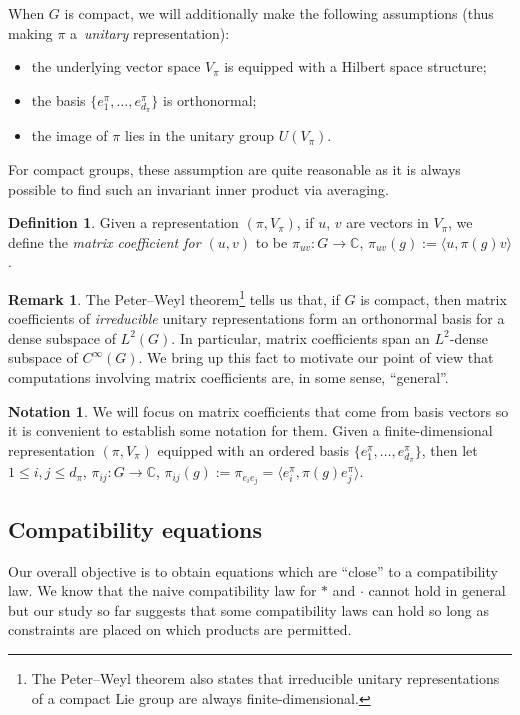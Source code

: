 \documentclass[pdftex]{sigma}
\numberwithin{equation}{section}
\theoremstyle{definition}
\newtheorem{Definition}[Theorem]{Definition}
\newtheorem{Remark}[Theorem]{Remark}
\newtheorem{notation}[Theorem]{Notation}
\begin{document}
When $ G $ is compact, we will additionally make the following assumptions (thus making $\pi$ a~\textit{unitary} representation):
\begin{itemize}\itemsep=0pt
  \item the underlying vector space $ V_\pi $ is equipped with a Hilbert space structure;
  \item the basis $ \{ e^{\pi}_1, \ldots, e^{\pi}_{d_\pi} \} $ is orthonormal;
  \item the image of $ \pi $ lies in the unitary group $ U(V_\pi) $.
\end{itemize}
For compact groups, these assumption are quite reasonable as it is always possible to find such an invariant inner product via averaging.
\begin{Definition} Given a representation $ (\pi, V_\pi) $, if $u$, $v$ are vectors in $V_\pi$, we define the \textit{matrix coefficient for $ (u,v) $} to be
$\pi_{uv} \colon G \to \mathbb{C}$, $\pi_{uv}(g) :=\langle u,\pi(g)v\rangle$.
\end{Definition}
\begin{Remark}
The Peter--Weyl theorem\footnote{The Peter--Weyl theorem also states that irreducible unitary representations of a compact Lie group are always finite-dimensional.} tells us that, if $ G $ is compact, then matrix coefficients of \emph{irreducible} unitary representations form an orthonormal basis for a dense subspace of $ L^2(G) $. In particular, matrix coefficients span an $ L^2$-dense subspace of $ C^\infty(G) $. We bring up this fact to motivate our point of view that computations involving matrix coefficients are, in some sense, ``general''.
\end{Remark}
\begin{notation}\label{Notation:matrix.coefficients}
We will focus on matrix coefficients that come from basis vectors so it is convenient to establish some notation for them. Given a finite-dimensional representation $ (\pi, V_\pi ) $ equipped with an ordered basis $ \{ e^\pi_1,\ldots, e^\pi_{d_{\pi}} \} $, then let
$1 \le i,j \le d_\pi$, $ \pi_{ij} \colon G \to \mathbb{C}$, $ \pi_{ij}(g):= \pi_{e_i e_j} = \langle e_i^{\pi},\pi(g)e_j^{\pi}\rangle$.
\end{notation}


\subsection{Compatibility equations}
Our overall objective is to obtain equations which are ``close'' to a compatibility law. We know that the naive compatibility law for $ * $ and $ \cdot $ cannot hold in general but our study so far suggests that some compatibility laws can hold so long as constraints are placed on which products are permitted.
\end{document}
